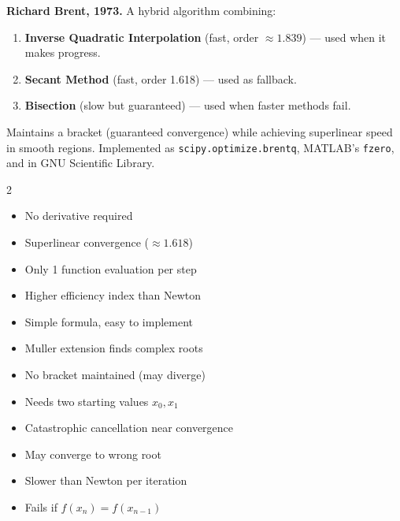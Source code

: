 \documentclass[12pt]{article}
\begin{document}
\begin{thmbox}
\textbf{Richard Brent, 1973.} A hybrid algorithm combining:
\begin{enumerate}[noitemsep]
  \item \textbf{Inverse Quadratic Interpolation} (fast, order $\approx 1.839$) — used when it makes progress.
  \item \textbf{Secant Method} (fast, order 1.618) — used as fallback.
  \item \textbf{Bisection} (slow but guaranteed) — used when faster methods fail.
\end{enumerate}
Maintains a bracket (guaranteed convergence) while achieving superlinear speed in smooth regions. Implemented as \texttt{scipy.optimize.brentq}, MATLAB's \texttt{fzero}, and in GNU Scientific Library.
\end{thmbox}

\begin{multicols}{2}
\begin{prosbox}
\begin{itemize}[noitemsep]
  \item No derivative required
  \item Superlinear convergence ($\approx 1.618$)
  \item Only 1 function evaluation per step
  \item Higher efficiency index than Newton
  \item Simple formula, easy to implement
  \item Muller extension finds complex roots
\end{itemize}
\end{prosbox}

\columnbreak

\begin{consbox}
\begin{itemize}[noitemsep]
  \item No bracket maintained (may diverge)
  \item Needs two starting values $x_0,x_1$
  \item Catastrophic cancellation near convergence
  \item May converge to wrong root
  \item Slower than Newton per iteration
  \item Fails if $f(x_n)=f(x_{n-1})$
\end{itemize}
\end{consbox}
\end{multicols}
\end{document}
